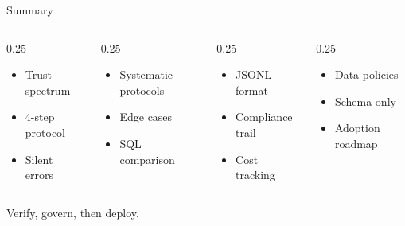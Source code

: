 \documentclass[aspectratio=169]{beamer}
\begin{document}
\begin{frame}{Summary}
\begin{columns}[T]
\begin{column}{0.25\textwidth}
\begin{shadedbox}[title=\textbf{Verification}]
\begin{itemize}\scriptsize
  \item Trust spectrum
  \item 4-step protocol
  \item Silent errors
\end{itemize}
\end{shadedbox}
\end{column}
\begin{column}{0.25\textwidth}
\begin{shadedbox}[title=\textbf{Red-Teaming}]
\begin{itemize}\scriptsize
  \item Systematic protocols
  \item Edge cases
  \item SQL comparison
\end{itemize}
\end{shadedbox}
\end{column}
\begin{column}{0.25\textwidth}
\begin{shadedbox}[title=\textbf{Audit Logs}]
\begin{itemize}\scriptsize
  \item JSONL format
  \item Compliance trail
  \item Cost tracking
\end{itemize}
\end{shadedbox}
\end{column}
\begin{column}{0.25\textwidth}
\begin{shadedbox}[title=\textbf{Governance}]
\begin{itemize}\scriptsize
  \item Data policies
  \item Schema-only
  \item Adoption roadmap
\end{itemize}
\end{shadedbox}
\end{column}
\end{columns}
\vspace{0.5cm}
\begin{center}
\alert{Verify, govern, then deploy.}
\end{center}
\end{frame}
\end{document}
